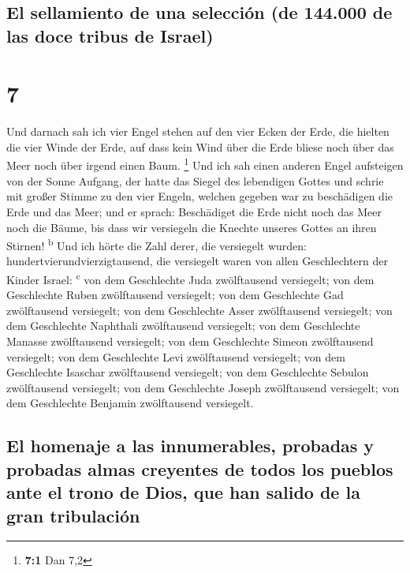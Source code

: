 \hypertarget{el-sellamiento-de-una-selecciuxf3n-de-144.000-de-las-doce-tribus-de-israel}{%
\subsection{El sellamiento de una selección (de 144.000 de las doce
tribus de
Israel)}\label{el-sellamiento-de-una-selecciuxf3n-de-144.000-de-las-doce-tribus-de-israel}}

\hypertarget{section-6}{%
\section{7}\label{section-6}}

 Und darnach sah ich vier Engel stehen auf den vier Ecken
der Erde, die hielten die vier Winde der Erde, auf dass kein Wind über
die Erde bliese noch über das Meer noch über irgend einen Baum.
\footnote{\textbf{7:1} Dan 7,2}  Und ich sah einen anderen
Engel aufsteigen von der Sonne Aufgang, der hatte das Siegel des
lebendigen Gottes und schrie mit großer Stimme zu den vier Engeln,
welchen gegeben war zu beschädigen die Erde und das Meer; 
und er sprach: Beschädiget die Erde nicht noch das Meer noch die Bäume,
bis dass wir versiegeln die Knechte unseres Gottes an ihren Stirnen!
\textsuperscript{b}  Und ich hörte die Zahl derer, die
versiegelt wurden: hundertvierundvierzigtausend, die versiegelt waren
von allen Geschlechtern der Kinder Israel: \textsuperscript{c}
 von dem Geschlechte Juda zwölftausend versiegelt; von dem
Geschlechte Ruben zwölftausend versiegelt; von dem Geschlechte Gad
zwölftausend versiegelt;  von dem Geschlechte Asser
zwölftausend versiegelt; von dem Geschlechte Naphthali zwölftausend
versiegelt; von dem Geschlechte Manasse zwölftausend versiegelt;
 von dem Geschlechte Simeon zwölftausend versiegelt; von
dem Geschlechte Levi zwölftausend versiegelt; von dem Geschlechte
Isaschar zwölftausend versiegelt;  von dem Geschlechte
Sebulon zwölftausend versiegelt; von dem Geschlechte Joseph zwölftausend
versiegelt; von dem Geschlechte Benjamin zwölftausend versiegelt.

\hypertarget{el-homenaje-a-las-innumerables-probadas-y-probadas-almas-creyentes-de-todos-los-pueblos-ante-el-trono-de-dios-que-han-salido-de-la-gran-tribulaciuxf3n}{%
\subsection{El homenaje a las innumerables, probadas y probadas almas
creyentes de todos los pueblos ante el trono de Dios, que han salido de
la gran
tribulación}\label{el-homenaje-a-las-innumerables-probadas-y-probadas-almas-creyentes-de-todos-los-pueblos-ante-el-trono-de-dios-que-han-salido-de-la-gran-tribulaciuxf3n}}

